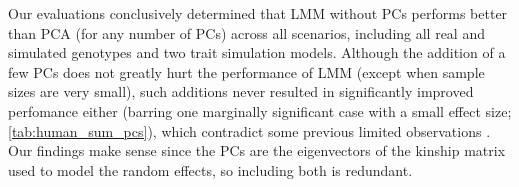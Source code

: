 \documentclass[11pt]{article}
\begin{document}










Our evaluations conclusively determined that LMM without PCs performs better than PCA (for any number of PCs) across all scenarios, including all real and simulated genotypes and two trait simulation models.
Although the addition of a few PCs does not greatly hurt the performance of LMM (except when sample sizes are very small), such additions never resulted in significantly improved perfomance either (barring one marginally significant case with a small effect size; \cref{tab:human_sum_pcs}), which contradict some previous limited observations \citep{zhao_arabidopsis_2007, price_new_2010}.
Our findings make sense since the PCs are the eigenvectors of the kinship matrix used to model the random effects, so including both is redundant.
\end{document}
